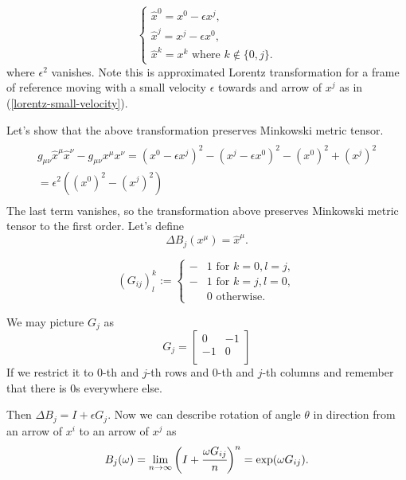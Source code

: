 \documentclass[main.tex]{subfiles}
\begin{document}
\begin{equation}
\begin{cases}
\hat{x}^0 =  x^0 - \epsilon x^j, \\
\hat{x}^j =  x^j - \epsilon x^0, \\
\hat{x}^k = x^k \text{ where } k\not\in\{0, j\}. 
\end{cases}
\end{equation}
where $\epsilon^2$ vanishes. Note this is approximated Lorentz transformation for a frame of reference moving with a small velocity $\epsilon$ towards and arrow of $x^j$ as in (\ref{lorentz-small-velocity}).

Let's show that the above transformation preserves Minkowski metric tensor.
\begin{multline*}
\\
g_{\mu\nu} \hat{x}^\mu \hat{x}^\nu - g_{\mu\nu} x^\mu x^\nu = 
 (x^0 - \epsilon x^j)^2 - (x^j - \epsilon x^0)^2 - (x^0)^2 + (x^j)^2 \\
 = \epsilon^2((x^0)^2 - (x^j)^2)\\
\end{multline*}
The last term vanishes, so the transformation above preserves Minkowski metric tensor to the first order.
Let's define
\begin{equation}
\Delta B_{j}(x^\mu) = \hat{x}^\mu.
\end{equation}

\begin{equation}
(G_{ij})^k_l :=  
\begin{cases}
-&1 \text{ for } k = 0, l = j,\\
-&1 \text{ for } k = j, l = 0,\\
&0 \text{ otherwise. }
\end{cases}
\end{equation}

We may picture $G_{j}$ as 
\begin{equation}
G_{j} = 
\begin{bmatrix}
0 & -1 \\
-1 & 0 \\
\end{bmatrix}
\end{equation}
If we restrict it to $0$-th and $j$-th rows and $0$-th and $j$-th columns and remember that there is $0$s everywhere else.

Then $\Delta B_{j} = I + \epsilon G_{j}$. 
Now we can describe rotation of angle $\theta$ in direction from an arrow of $x^i$ to an arrow of $x^j$ as
\begin{equation}
B_{j}(\omega) = \lim_{n \to \infty} \bigg(I + \cfrac{\omega G_{ij}}{n}\bigg)^n = \exp(\omega G_{ij}).
\end{equation}
\end{document}
